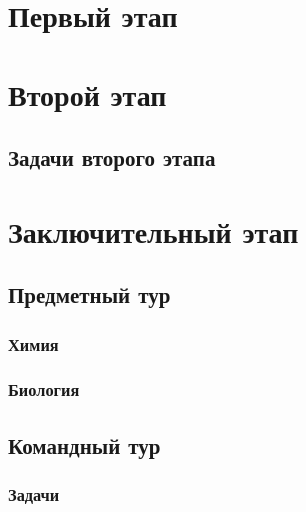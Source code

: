 \documentclass[a4paper,12pt,oneside]{book}
\begin{document}

\setcounter{tocdepth}{1}

\tableofcontents

\part{Первый этап}
\clearpage




\part{Второй этап}
\clearpage 
\chapter{Задачи второго этапа}



\part{Заключительный этап}

\clearpage
\chapter{Предметный тур}

\section{Химия}


\section{Биология}


\chapter{Командный тур}
\section{Задачи}

\end{document}

